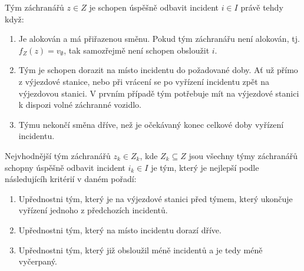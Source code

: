 \clearpage 

\begin{definice}\label{df:simulacePravidla1}
  Tým záchranářů $z \in Z$ je schopen úspěšně odbavit incident $i \in I$ právě tehdy když:

  \begin{enumerate}
    \item
      Je alokován a má přiřazenou směnu. Pokud tým záchranářu není alokován, tj. $f_Z(z) = v_{\emptyset}$, tak samozřejmě není schopen obsloužit $i$.

    \item
      Tým je schopen dorazit na místo incidentu do požadované doby.
      Ať už přímo z výjezdové stanice, nebo při vrácení se po vyřízení incidentu zpět na výjezdovou stanici. 
      V prvním případě tým potřebuje mít na výjezdové stanici k dispozi volné záchranné vozidlo.

    \item
      Týmu nekončí směna dříve, než je očekávaný konec celkové doby vyřízení incidentu.
  \end{enumerate}
\end{definice}


\begin{definice}\label{df:simulacePravidla2}
  Nejvhodnější tým záchranářů $z_k \in Z_k$, kde $Z_k \subseteq Z$ jsou všechny týmy záchranářů schopny úspěšně odbavit incident $i_k \in I$ je tým,
  který je nejlepší podle následujícíh kritérií v daném pořadí:

  \begin{enumerate}
    \item Upřednostni tým, který je na výjezdové stanici před týmem, který ukončuje vyřízení jednoho z předchozích incidentů. 
    \item Upřednostni tým, který na místo incidentu dorazí dříve. 
    \item Upřednostni tým, který již obsloužil méně incidentů a je tedy méně vyčerpaný.
  \end{enumerate}
\end{definice}

